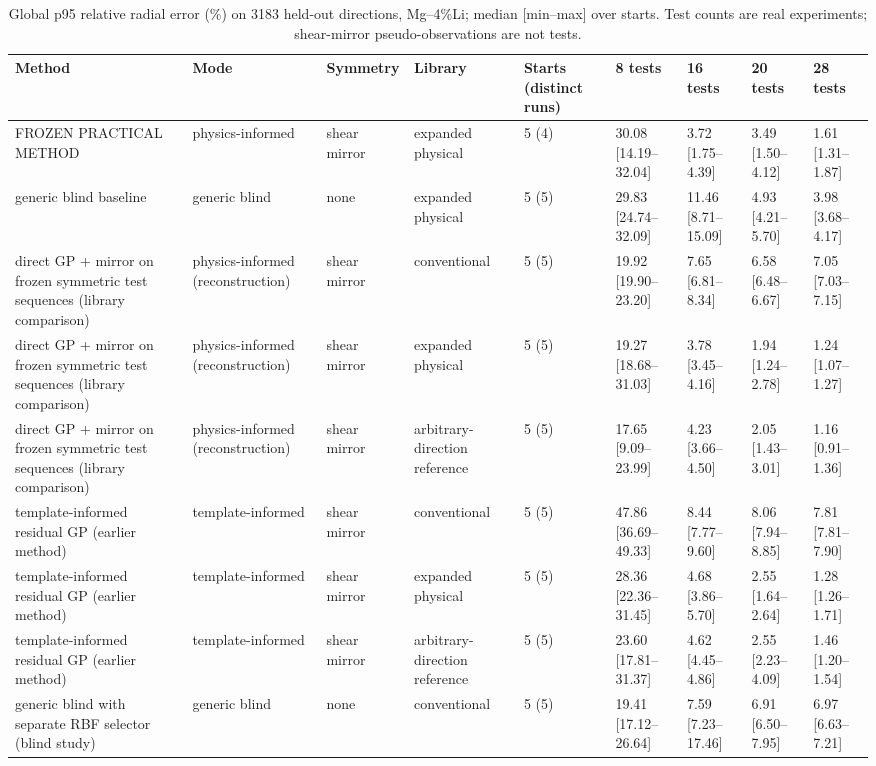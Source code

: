 \begin{table}[t]
\centering
\scriptsize
\caption{Global p95 relative radial error (\%) on 3183 held-out directions, Mg--4\%Li; median [min--max] over starts. Test counts are real experiments; shear-mirror pseudo-observations are not tests.}
\label{tab:main_results}
\begin{tabular}{lllllllll}
\hline
Method & Mode & Symmetry & Library & Starts (distinct runs) & 8 tests & 16 tests & 20 tests & 28 tests \\
\hline
FROZEN PRACTICAL METHOD & physics-informed & shear mirror & expanded physical & 5 (4) & 30.08 [14.19--32.04] & 3.72 [1.75--4.39] & 3.49 [1.50--4.12] & 1.61 [1.31--1.87] \\
generic blind baseline & generic blind & none & expanded physical & 5 (5) & 29.83 [24.74--32.09] & 11.46 [8.71--15.09] & 4.93 [4.21--5.70] & 3.98 [3.68--4.17] \\
direct GP + mirror on frozen symmetric test sequences (library comparison) & physics-informed (reconstruction) & shear mirror & conventional & 5 (5) & 19.92 [19.90--23.20] & 7.65 [6.81--8.34] & 6.58 [6.48--6.67] & 7.05 [7.03--7.15] \\
direct GP + mirror on frozen symmetric test sequences (library comparison) & physics-informed (reconstruction) & shear mirror & expanded physical & 5 (5) & 19.27 [18.68--31.03] & 3.78 [3.45--4.16] & 1.94 [1.24--2.78] & 1.24 [1.07--1.27] \\
direct GP + mirror on frozen symmetric test sequences (library comparison) & physics-informed (reconstruction) & shear mirror & arbitrary-direction reference & 5 (5) & 17.65 [9.09--23.99] & 4.23 [3.66--4.50] & 2.05 [1.43--3.01] & 1.16 [0.91--1.36] \\
template-informed residual GP (earlier method) & template-informed & shear mirror & conventional & 5 (5) & 47.86 [36.69--49.33] & 8.44 [7.77--9.60] & 8.06 [7.94--8.85] & 7.81 [7.81--7.90] \\
template-informed residual GP (earlier method) & template-informed & shear mirror & expanded physical & 5 (5) & 28.36 [22.36--31.45] & 4.68 [3.86--5.70] & 2.55 [1.64--2.64] & 1.28 [1.26--1.71] \\
template-informed residual GP (earlier method) & template-informed & shear mirror & arbitrary-direction reference & 5 (5) & 23.60 [17.81--31.37] & 4.62 [4.45--4.86] & 2.55 [2.23--4.09] & 1.46 [1.20--1.54] \\
generic blind with separate RBF selector (blind study) & generic blind & none & conventional & 5 (5) & 19.41 [17.12--26.64] & 7.59 [7.23--17.46] & 6.91 [6.50--7.95] & 6.97 [6.63--7.21] \\

\end{tabular}
\end{table}
